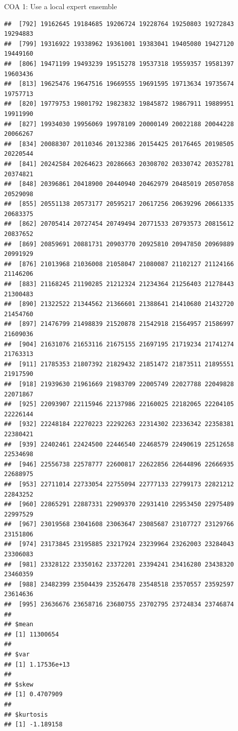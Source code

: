 \documentclass[ignorenonframetext,]{beamer}
\begin{document}
\begin{frame}[fragile]{COA 1: Use a local expert ensemble}
\begin{verbatim}
##  [792] 19162645 19184685 19206724 19228764 19250803 19272843 19294883
##  [799] 19316922 19338962 19361001 19383041 19405080 19427120 19449160
##  [806] 19471199 19493239 19515278 19537318 19559357 19581397 19603436
##  [813] 19625476 19647516 19669555 19691595 19713634 19735674 19757713
##  [820] 19779753 19801792 19823832 19845872 19867911 19889951 19911990
##  [827] 19934030 19956069 19978109 20000149 20022188 20044228 20066267
##  [834] 20088307 20110346 20132386 20154425 20176465 20198505 20220544
##  [841] 20242584 20264623 20286663 20308702 20330742 20352781 20374821
##  [848] 20396861 20418900 20440940 20462979 20485019 20507058 20529098
##  [855] 20551138 20573177 20595217 20617256 20639296 20661335 20683375
##  [862] 20705414 20727454 20749494 20771533 20793573 20815612 20837652
##  [869] 20859691 20881731 20903770 20925810 20947850 20969889 20991929
##  [876] 21013968 21036008 21058047 21080087 21102127 21124166 21146206
##  [883] 21168245 21190285 21212324 21234364 21256403 21278443 21300483
##  [890] 21322522 21344562 21366601 21388641 21410680 21432720 21454760
##  [897] 21476799 21498839 21520878 21542918 21564957 21586997 21609036
##  [904] 21631076 21653116 21675155 21697195 21719234 21741274 21763313
##  [911] 21785353 21807392 21829432 21851472 21873511 21895551 21917590
##  [918] 21939630 21961669 21983709 22005749 22027788 22049828 22071867
##  [925] 22093907 22115946 22137986 22160025 22182065 22204105 22226144
##  [932] 22248184 22270223 22292263 22314302 22336342 22358381 22380421
##  [939] 22402461 22424500 22446540 22468579 22490619 22512658 22534698
##  [946] 22556738 22578777 22600817 22622856 22644896 22666935 22688975
##  [953] 22711014 22733054 22755094 22777133 22799173 22821212 22843252
##  [960] 22865291 22887331 22909370 22931410 22953450 22975489 22997529
##  [967] 23019568 23041608 23063647 23085687 23107727 23129766 23151806
##  [974] 23173845 23195885 23217924 23239964 23262003 23284043 23306083
##  [981] 23328122 23350162 23372201 23394241 23416280 23438320 23460359
##  [988] 23482399 23504439 23526478 23548518 23570557 23592597 23614636
##  [995] 23636676 23658716 23680755 23702795 23724834 23746874
## 
## $mean
## [1] 11300654
## 
## $var
## [1] 1.17536e+13
## 
## $skew
## [1] 0.4707909
## 
## $kurtosis
## [1] -1.189158
\end{verbatim}

\end{frame}
\end{document}
